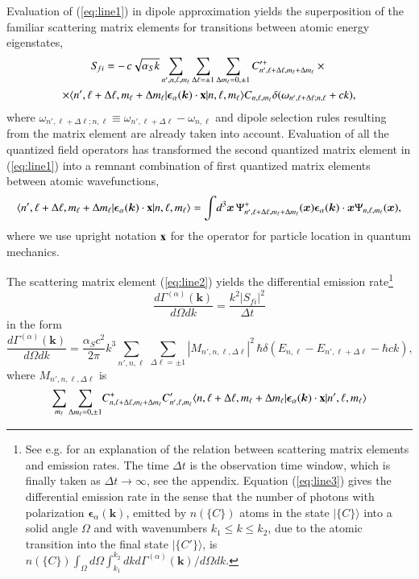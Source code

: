 \documentclass[final,3p,12pt]{elsarticle3}
\begin{document}
Evaluation of (\ref{eq:line1}) in dipole approximation yields the superposition 
of the familiar scattering matrix elements for transitions between atomic 
energy eigenstates,
\begin{multline}
S_{\!fi}=-\,c\sqrt{\alpha_S k}
\sum_{n',n,\ell,m_\ell}\sum_{\Delta\ell=\pm 1}\sum_{\Delta m_\ell=0,\pm 1}
C'^+_{n',\ell+\Delta\ell,m_\ell+\Delta m_\ell}\times{}
\\
\times
\langle n',\ell+\Delta\ell,m_\ell+\Delta m_\ell|
\bm{\epsilon}_\alpha(\bm{k})\cdot\mathrm{\bf x}|n,\ell,m_\ell\rangle
\label{eq:line2}
C_{n,\ell,m_\ell}\delta(\omega_{n',\ell+\Delta\ell;n,\ell}+ck),
\end{multline}
where $\omega_{n',\ell+\Delta\ell;n,\ell}\equiv\omega_{n',\ell+\Delta\ell}-\omega_{n,\ell}$
and dipole selection rules resulting from the matrix element are 
already taken into account. Evaluation of all the quantized field operators
has transformed the second quantized matrix element in (\ref{eq:line1}) 
into a remnant combination of first quantized matrix elements between 
atomic wavefunctions,
\begin{equation*}
\langle n',\ell+\Delta\ell,m_\ell+\Delta m_\ell|
\bm{\epsilon}_\alpha(\bm{k})\cdot\mathrm{\bf x}|n,\ell,m_\ell\rangle
=
\int\!d^3\bm{x}\,\Psi^+_{n',\ell+\Delta\ell,m_\ell+\Delta m_\ell}(\bm{x})
\bm{\epsilon}_\alpha(\bm{k})\cdot\bm{x}\Psi_{n,\ell,m_\ell}(\bm{x}),
\end{equation*}
where we use upright notation $\mathrm{\bf x}$ for the
operator for particle location in quantum mechanics.

The scattering matrix element (\ref{eq:line2}) yields the differential 
emission rate\footnote{See e.g. \cite{heitler,rdqm} for an explanation of the
relation between scattering matrix elements and emission rates.
The time $\Delta t$ is the observation time window, which is finally taken
as $\Delta t\to\infty$, see the appendix.
Equation (\ref{eq:line3}) gives the differential emission rate in the sense
that the number of photons with polarization $\bm{\epsilon}_\alpha(\bm{k})$,
emitted by $n(\{C\})$ atoms in the 
state $\bm{|}\{C\}\bm{\rangle}$ into a solid angle $\Omega$ and with wavenumbers
$k_1\le k\le k_2$, due to the atomic
transition into the final state $\bm{|}\{C'\}\bm{\rangle}$,
is $n(\{C\})\int_{\Omega}d\Omega\int_{k_1}^{k_2}dk d\Gamma^{(\alpha)}(\bm{k})/d\Omega dk$.
}
$$\frac{d\Gamma^{(\alpha)}(\bm{k})}{d\Omega dk}=\frac{k^2|S_{\!fi}|^2}{\Delta t}
$$
in the form
\begin{equation}
\frac{d\Gamma^{(\alpha)}(\bm{k})}{d\Omega dk}
=\frac{\alpha_S c^2}{2\pi}k^3\sum_{n',n,\ell}\,\sum_{\Delta\ell=\pm 1}
|M_{n',n,\ell,\Delta\ell}|^2\,
\hbar\delta(E_{n,\ell}-E_{n',\ell+\Delta\ell}-\hbar ck),
\label{eq:line3}
\end{equation}
where $M_{n',n,\ell,\Delta\ell}$ is 
$$
\sum_{m_\ell}\sum_{\Delta m_\ell=0,\pm 1}\!
 C^+_{n,\ell+\Delta\ell,m_\ell+\Delta m_\ell}
 C'_{n',\ell,m_\ell}\langle n,\ell+\Delta\ell,m_\ell+\Delta m_\ell|
 \bm{\epsilon}_\alpha(\bm{k})\cdot\mathrm{\bf x}
|n',\ell,m_\ell\rangle
$$
\end{document}
